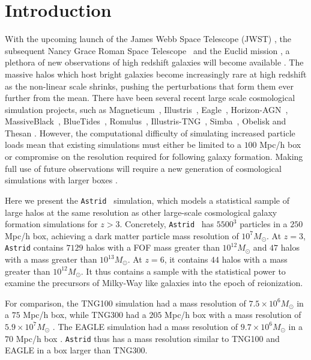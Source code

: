 \documentclass[fleqn,usenatbib]{mnras}
\def\astrid{\texttt{Astrid} }
\begin{document}
\section{Introduction}
With the upcoming launch of the James Webb Space Telescope (JWST) \citep{JWST}, the subsequent Nancy Grace Roman Space  Telescope~\citep[NGRST, formerly WFIRST][]{WFIRST} and the Euclid mission \citep{Euclid2019},
a plethora of new observations of high redshift galaxies will become available \citep[e.g~][]{2020MNRAS.492.5167V}. The massive halos which host bright galaxies become increasingly rare at high redshift as the non-linear scale shrinks, pushing the perturbations that form them ever further from the mean. There have been several recent large scale cosmological simulation projects, such as Magneticum~\citep{Hirschmann2014}, Illustris~\citep{Vogelsberger:2014}, Eagle~\citep{2015MNRAS.446..521S}, Horizon-AGN~\citep{Dubois2015,Volonteri2016Horizon-AGN}, MassiveBlack~\citep{Khandai2015}, BlueTides~\citep{Feng:2016}, Romulus~\citep{Tremmel2017}, Illustris-TNG~\citep{2018MNRAS.475..676S, 2018MNRAS.475..624N}, Simba~\citep{Dave2019-simba}, Obelisk \citep{2021A&A...653A.154T} and Thesan \citep{2021arXiv211000584K}. However, the computational difficulty of simulating increased particle loads mean that existing simulations must either be limited to a $100$ Mpc/h box or compromise on the resolution required for following galaxy formation. Making full use of future observations will require a new generation of cosmological simulations with larger boxes \citep{Pillepich:2018}.

Here we present the \astrid~simulation, which models a statistical sample of large halos at the same resolution as other large-scale cosmological galaxy formation simulations for $z > 3$. Concretely, \astrid~has $5500^3$ particles in a $250$ Mpc/h box, achieving a dark matter particle mass resolution of $10^7 M_\odot$. At $z=3$, \astrid contains $7129$ halos with a FOF mass greater than $10^{12} M_\odot$ and $47$ halos with a mass greater than $10^{13} M_\odot$. At $z=6$, it contains $44$ halos with a mass greater than $10^{12} M_\odot$. It thus contains a sample with the statistical power to examine the precursors of Milky-Way like galaxies into the epoch of reionization.

For comparison, the TNG100 simulation had a mass resolution of $7.5 \times 10^6 M_\odot$ in a $75$ Mpc/h box, while TNG300 had a $205$ Mpc/h box with a mass resolution of $5.9\times 10^7 M_\odot$ \citep{2018MNRAS.475..676S, 2018MNRAS.475..624N, 2018MNRAS.480.5113M,2018MNRAS.477.1206N}. The EAGLE simulation had a mass resolution of $9.7 \times 10^6 M_\odot$ in a $70$ Mpc/h box \citep{2015MNRAS.446..521S}. \astrid thus has a mass resolution similar to TNG100 and EAGLE in a box larger than TNG300.
\end{document}
